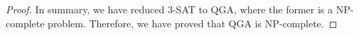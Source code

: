 \begin{proof}
	In summary, we have reduced 3-SAT to QGA, where the former is a NP-complete problem. Therefore, we have proved that QGA is NP-complete. 

%	
%	
%	

\end{proof}
